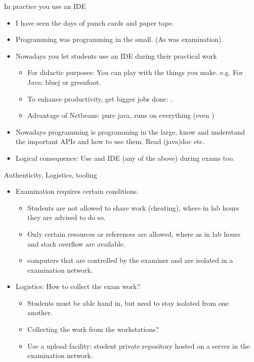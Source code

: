 \begin{frame}{In practice you use an IDE}
  \begin{itemize}
  \item I have seen the days of punch cards and paper tape.
  \item Programming was programming in the small. (As was examination).
  \item Nowadays you let students use an IDE during their practical work
    \begin{itemize}
    \item For didactic purposes: You can play with the things you
      make. e.g. For Java: bluej or greenfoot.
    \item To enhance productivity, get bigger jobs done: .
    \item Advantage of Netbeans: pure java, runs on everything (even
      )
    \end{itemize}
  \item Nowadays programming is programming in the large, know and
    understand the important APIs and how to use them. Read (java)doc etc.
  \item Logical consequence: Use and IDE (any of the above) during
    exams too.
  \end{itemize}
\end{frame}

\begin{frame}{Authenticity, Logistics, tooling}
  \begin{itemize}
  \item Examination requires certain conditions.
    \begin{itemize}
    \item Students are not allowed to share work (cheating), where in lab hours
      they are advised to do so.
    \item Only certain resources or references are allowed, where as
      in lab hours  and \alert{stack overflow} are available.
    \item {} computers that are controlled by the examiner and
      are isolated in a examination network.
    \end{itemize}
  \item Logistics: How to collect the exam work?
    \begin{itemize}
    \item Students must be able hand in, but need to stay isolated from one another.
    \item Collecting the work from the workstations?

    \item Use a upload facility: student private repository hosted on
      a server in the examination network.
    \end{itemize}
  \end{itemize}
\end{frame}

